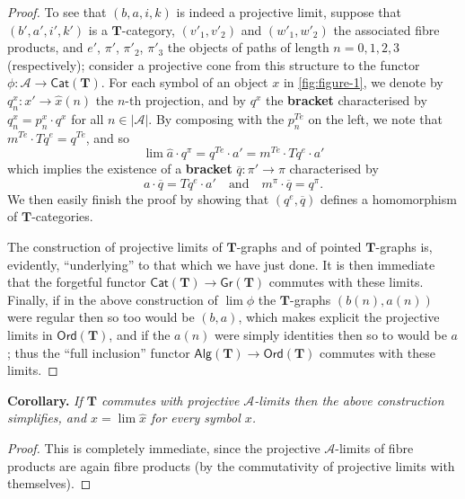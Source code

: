 \documentclass{article}
\newenvironment{itenv}[1]
  {\phantomsection\par\medskip\noindent\textbf{#1.}\itshape}
  {\par\medskip}
\newcommand{\oldpage}[1]{\marginpar{\footnotesize$\Big\vert$ \textit{p.~#1}}}
\newcommand{\unsure}[1]{{\color{purple}\textbf{#1}}}
\newcommand{\TT}{\mathbf{T}}
\newcommand{\textand}{\quad\text{and}\quad}
\newcommand{\cat}[1]{\mathcal{#1}}
\newcommand{\Cat}[1]{\mathsf{#1}}
\newcommand{\set}[1]{|#1|}
\newcommand{\Gr}[1]{\Cat{Gr}(#1)}
\newcommand{\Alg}[1]{\Cat{Alg}(#1)}
\newcommand{\Ord}[1]{\Cat{Ord}(#1)}
\begin{document}
\begin{proof}
  \oldpage{234}
  To see that $(b,a,i,k)$ is indeed a projective limit, suppose that $(b',a',i',k')$ is a $\TT$-category, $(v'_1,v'_2)$ and $(w'_1,w'_2)$ the associated fibre products, and $e'$, $\pi'$, $\pi'_2$, $\pi'_3$ the objects of paths of length $n=0,1,2,3$ (respectively); consider a projective cone from this structure to the functor $\phi\colon\cat{A}\to\Cat{Cat}(\TT)$.
  For each symbol of an object $x$ in \cref{fig:figure-1}, we denote by $q_n^x\colon x'\to\hat{x}(n)$ the $n$-th projection, and by $q^x$ the \unsure{bracket} characterised by $q_n^x=p_n^x\cdot q^x$ for all $n\in\set{\cat{A}}$.
  By composing with the $p_n^{Te}$ on the left, we note that $m^{Te}\cdot Tq^e=q^{Te}$, and so
  \[
    \lim\hat{a}\cdot q^\pi
    = q^{Te}\cdot a'
    = m^{Te}\cdot Tq^e\cdot a'
  \]
  which implies the existence of a \unsure{bracket} $\overline{q}\colon\pi'\to\pi$ characterised by
  \[
    a\cdot\overline{q} = Tq^e\cdot a'
    \textand
    m^\pi\cdot\overline{q} = q^\pi.
  \]
  We then easily finish the proof by showing that $(q^e,\overline{q})$ defines a homomorphism of $\TT$-categories.

  The construction of projective limits of $\TT$-graphs and of pointed $\TT$-graphs is, evidently, ``underlying'' to that which we have just done.
  It is then immediate that the forgetful functor $\Cat{Cat}(\TT)\to\Gr{\TT}$ commutes with these limits.
  Finally, if in the above construction of $\lim\phi$ the $\TT$-graphs $(b(n),a(n))$ were regular then so too would be $(b,a)$, which makes explicit the projective limits in $\Ord{\TT}$, and if the $a(n)$ were simply identities then so to would be $a$;
  thus the ``full inclusion'' functor $\Alg{\TT}\to\Ord{\TT}$ commutes with these limits.
\end{proof}

\begin{itenv}{Corollary}
  If $\TT$ commutes with projective $\cat{A}$-limits then the above construction simplifies, and $x=\lim\hat{x}$ for every symbol $x$.
\end{itenv}

\begin{proof}
  This is completely immediate, since the projective $\cat{A}$-limits of fibre products are again fibre products (by the commutativity of projective limits with themselves).
\end{proof}
\end{document}
